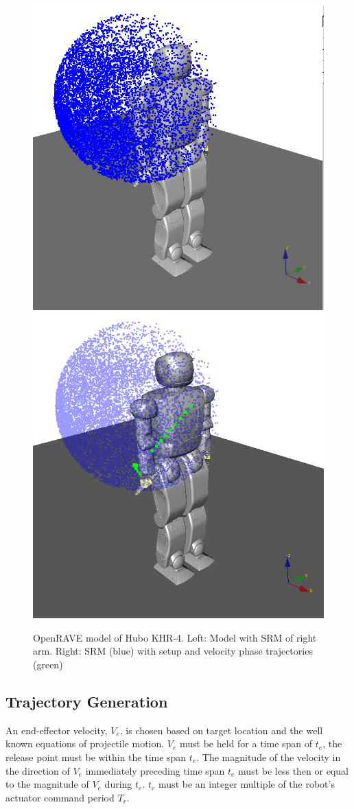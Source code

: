 \begin{figure}[thpb]
  \centering
\includegraphics[width=0.5\columnwidth]{./pictures/final/SRM.png}\includegraphics[width=0.5\columnwidth]{./pictures/final/ThrowTrajDiag.png}
  \caption{OpenRAVE model of Hubo KHR-4. Left: Model with SRM of right arm.  Right: SRM (blue) with setup and velocity phase trajectories (green)  }
  \label{fig:vHuboSparse}
\end{figure}



\subsection{Trajectory Generation}\label{sec:trajGen}
An end-effector velocity, $V_e$, is chosen based on target location and the well known equations of projectile motion.  $V_e$ must be held for a time span of $t_e$, the release point must be within the time span $t_e$.  The magnitude of the velocity in the direction of $V_e$ immediately preceding time span $t_e$ must be less then or equal to the magnitude of $V_e$ during $t_e$.  $t_e$ must be an integer multiple of the robot's actuator command period $T_r$.

